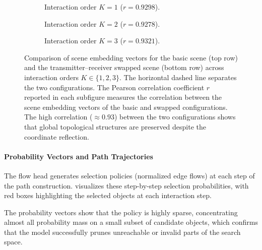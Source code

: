 \begin{figure}
  \centering
  \begin{subfigure}[b]{\contentwidth}
    \centering
    \caption{Interaction order $K=1$ ($r = 0.9298$).}
  \end{subfigure}

  \begin{subfigure}[b]{\contentwidth}
    \centering
    \caption{Interaction order $K=2$ ($r = 0.9278$).}
  \end{subfigure}

  \begin{subfigure}[b]{\contentwidth}
    \centering
    \caption{Interaction order $K=3$ ($r = 0.9321$).}
  \end{subfigure}
  \caption{Comparison of scene embedding vectors for the basic scene (top row) and the transmitter--receiver swapped scene (bottom row) across interaction orders $K \in \{1, 2, 3\}$. The horizontal dashed line separates the two configurations. The Pearson correlation coefficient $r$ reported in each subfigure measures the correlation between the scene embedding vectors of the basic and swapped configurations. The high correlation ($\approx 0.93$) between the two configurations shows that global topological structures are preserved despite the coordinate reflection.}
\end{figure}

\paragraph{Probability Vectors and Path Trajectories} The flow head generates selection policies (normalized edge flows) at each step of the path construction.  visualizes these step-by-step selection probabilities, with red boxes highlighting the selected objects at each interaction step.

The probability vectors show that the policy is highly sparse, concentrating almost all probability mass on a small subset of candidate objects, which confirms that the model successfully prunes unreachable or invalid parts of the search space.

